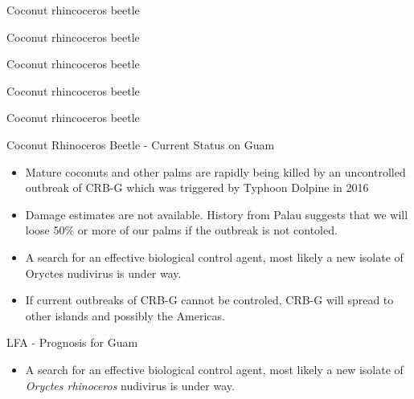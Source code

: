 \documentclass[]{beamer}
\begin{document}
\begin{frame}{Coconut rhincoceros beetle}
\end{frame}

\begin{frame}{Coconut rhincoceros beetle}
\end{frame}

\begin{frame}{Coconut rhincoceros beetle}
\end{frame}

\begin{frame}{Coconut rhincoceros beetle}
\end{frame}

\begin{frame}{Coconut rhincoceros beetle}
\end{frame}

\begin{frame}{Coconut Rhinoceros Beetle - Current Status on Guam}
	\begin{itemize}
		\item Mature coconuts and other palms are rapidly being killed by an uncontrolled outbreak of CRB-G which was triggered by Typhoon Dolpine in 2016
		\item Damage estimates are not available. History from Palau suggests that we will loose 50\% or more of our palms if the outbreak is not contoled.
		\item A search for an effective biological control agent, most likely a new isolate of Oryctes nudivirus is under way.
		\item If current outbreaks of CRB-G cannot be controled, CRB-G will spread to other islands and possibly the Americas.
	\end{itemize}
\end{frame}

\begin{frame}{LFA - Prognosis for Guam}
	\begin{itemize}
		\item A search for an effective biological control agent, most likely a new isolate of \textit{Oryctes rhinoceros} nudivirus is under way.
	\end{itemize}
\end{frame}
\end{document}
